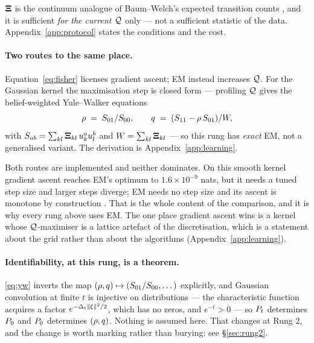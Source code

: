 \documentclass{article}
\theoremstyle{definition}
\theoremstyle{plain}
\begin{document}
$\mathbf{\Xi}$ is the continuum analogue of Baum--Welch's expected transition counts \citep{baum1970}, and
it is sufficient \emph{for the current $\mathcal{Q}$} only --- not a sufficient statistic of the data.
Appendix~\ref{app:protocol} states the conditions and the cost.

\paragraph{Two routes to the same place.} Equation~\eqref{eq:fisher} licenses gradient ascent;
EM instead increases $\mathcal{Q}$. For the Gaussian kernel the maximisation step is closed form ---
profiling $\mathcal{Q}$ gives the belief-weighted Yule--Walker equations
\begin{equation}
\label{eq:yw}
\rho \;=\; S_{01}/S_{00},
\qquad
q \;=\; (S_{11} - \rho\,S_{01})/W ,
\end{equation}
with $S_{ab}=\sum_{kl}\mathbf{\Xi}_{kl}\,u_{k}^{a}u_{l}^{b}$ and $W=\sum_{kl}\mathbf{\Xi}_{kl}$ --- so
this rung has \emph{exact} EM, not a generalised variant. The derivation is
Appendix~\ref{app:learning}.

Both routes are implemented and neither dominates. On this smooth kernel gradient ascent reaches
EM's optimum to $1.6\times10^{-9}$ nats, but it needs a tuned step size and larger steps diverge;
EM needs no step size and its ascent is monotone by construction \citep{dempster1977maximum,wu1983}.
That is the whole content of the comparison, and it is why every rung above uses EM. The one place
gradient ascent wins is a kernel whose $\mathcal{Q}$-maximiser is a lattice artefact of the
discretisation, which is a statement about the grid rather than about the algorithms
(Appendix~\ref{app:learning}).

\paragraph{Identifiability, at this rung, is a theorem.} \eqref{eq:yw} inverts the map
$(\rho,q)\mapsto(S_{01}/S_{00},\dots)$ explicitly, and Gaussian convolution at finite $t$ is
injective on distributions --- the characteristic function acquires a factor
$e^{-\Delta_t\|\xi\|^2/2}$, which has no zeros, and $e^{-t}>0$ --- so $P_t$ determines $P_0$ and
$P_0$ determines $(\rho,q)$. Nothing is assumed here. That changes at Rung 2, and the change
is worth marking rather than burying: see \S\ref{sec:rung2}.
\end{document}

